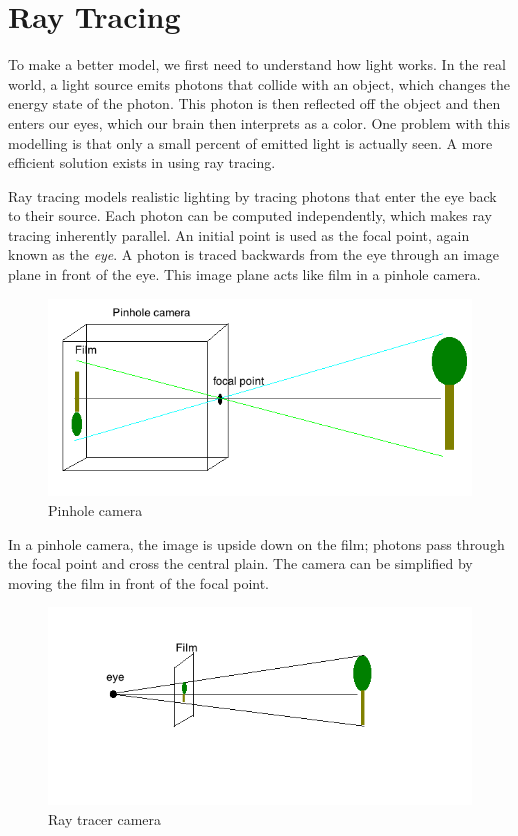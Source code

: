 \section{Ray Tracing}

To make a better model, we first need to understand how light works.  In the real world, a light source emits photons that collide with an object, which changes the energy state of the photon.  This photon is then reflected off the object and then enters our eyes, which our brain then interprets as a color.  One problem with this modelling is that only a small percent of emitted light is actually seen.  A more efficient solution exists in using ray tracing.  

Ray tracing models realistic lighting by tracing photons that enter the eye back to their source.  Each photon can be computed independently, which makes ray tracing inherently parallel.  An initial point is used as the focal point, again known as the \textit{eye}.  A photon is traced backwards from the eye through an image plane in front of the eye.  This image plane acts like film in a pinhole camera.  

\begin{figure}[H]
\begin{center}
\includegraphics[scale=0.50]{pineholecamera.png} 
\caption{Pinhole camera}
\label{pinhole-camera}
\end{center}
\end{figure}

In a pinhole camera, the image is upside down on the film; photons pass through the focal point and cross the central plain.  The camera can be simplified by moving the film in front of the focal point.

 \begin{figure}[H]
 \begin{center}
\includegraphics[scale=0.50]{raycamera.png} 
\caption{Ray tracer camera}
\label{ray-camera}
\end{center}
\end{figure}

